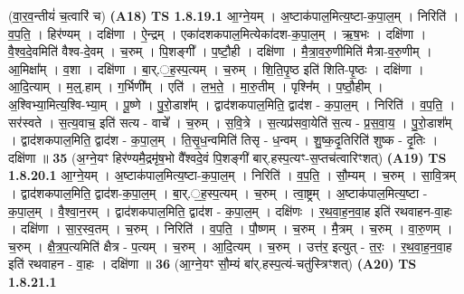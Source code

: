 \documentclass[17pt]{extarticle}
\begin{document}
                  \newline
                      (वा॒॒र॒व॒न्तीयं॑ च॒त्वारि॑ च) \textbf{(A18)} \newline \newline
                                \textbf{ TS 1.8.19.1} \newline
                  आ॒ग्ने॒यम् । अ॒ष्टाक॑पाल॒मित्य॒ष्टा-क॒पा॒ल॒म् । निरिति॑ । व॒प॒ति॒ । हिर॑ण्यम् । दक्षि॑णा । ऐ॒न्द्रम् । एका॑दशकपाल॒मित्येका॑दश-क॒पा॒ल॒म् । ऋ॒ष॒भः । दक्षि॑णा । वै॒श्व॒दे॒वमिति॑ वैश्व-दे॒वम् । च॒रुम् । पि॒शङ्गी᳚ । प॒ष्टौ॒ही । दक्षि॑णा । मै॒त्रा॒व॒रु॒णीमिति॑ मैत्रा-व॒रु॒णीम् । आ॒मिक्षा᳚म् । व॒शा । दक्षि॑णा । बा॒र्.॒ह॒स्प॒त्यम् । च॒रुम् । शि॒ति॒पृ॒ष्ठ इति॑ शिति-पृ॒ष्ठः । दक्षि॑णा । आ॒दि॒त्याम् । म॒ल्॒.हाम् । ग॒र्भिणी᳚म् । एति॑ । ल॒भ॒ते॒ । मा॒रु॒तीम् । पृश्नि᳚म् । प॒ष्ठौ॒हीम् । अ॒श्विभ्या॒मित्य॒श्वि-भ्या॒म् । पू॒ष्णे । पु॒रो॒डाश᳚म् । द्वाद॑शकपाल॒मिति॒ द्वाद॑श - क॒पा॒ल॒म् । निरिति॑ । व॒प॒ति॒ । सर॑स्वते । स॒त्य॒वाच॒ इति॑ सत्य - वाचे᳚ । च॒रुम् । स॒वि॒त्रे । स॒त्यप्र॑सवा॒येति॑ स॒त्य - प्र॒स॒वा॒य॒ । पु॒रो॒डाश᳚म् । द्वाद॑शकपाल॒मिति॒ द्वाद॑श - क॒पा॒ल॒म् । ति॒सृ॒ध॒न्वमिति॑ तिसृ - ध॒न्वम् । शु॒ष्क॒दृ॒तिरिति॑ शुष्क - दृ॒तिः । दक्षि॑णा ॥ \textbf{  35} \newline
                  \newline
                      (अ॒ग्ने॒यꣳ हिर॑ण्यमै॒द्रमृ॑ष॒भो वै᳚श्वदे॒वं पि॒शङ्गी॑ बार्.हस्प॒त्यꣳ-स॒प्तच॑त्वारिꣳशत्)  \textbf{(A19)} \newline \newline
                                \textbf{ TS 1.8.20.1} \newline
                  आ॒ग्ने॒यम् । अ॒ष्टाक॑पाल॒मित्य॒ष्टा-क॒पा॒ल॒म् । निरिति॑ । व॒प॒ति॒ । सौ॒म्यम् । च॒रुम् । सा॒वि॒त्रम् । द्वाद॑शकपाल॒मिति॒ द्वाद॑श-क॒पा॒ल॒म् । बा॒र्.॒ह॒स्प॒त्यम् । च॒रुम् । त्वा॒ष्ट्रम् । अ॒ष्टाक॑पाल॒मित्य॒ष्टा - क॒पा॒ल॒म् । वै॒श्वा॒न॒रम् । द्वाद॑शकपाल॒मिति॒ द्वाद॑श - क॒पा॒ल॒म् । दक्षि॑णः । र॒थ॒वा॒ह॒न॒वा॒ह इति॑ रथवाहन-वा॒हः । दक्षि॑णा । सा॒र॒स्व॒तम् । च॒रुम् । निरिति॑ । व॒प॒ति॒ । पौ॒ष्णम् । च॒रुम् । मै॒त्रम् । च॒रुम् । वा॒रु॒णम् । च॒रुम् । क्षै॒त्र॒प॒त्यमिति॑ क्षैत्र - प॒त्यम् । च॒रुम् । आ॒दि॒त्यम् । च॒रुम् । उत्त॑र॒ इत्युत् - त॒रः॒ । र॒थ॒वा॒ह॒न॒वा॒ह इति॑ रथवाहन - वा॒हः । दक्षि॑णा ॥ \textbf{  36} \newline
                  \newline
                      (आ॒ग्ने॒यꣳ सौ॒म्यं बा॑र्.हस्प॒त्यं-चतु॑स्त्रिꣳशत्)  \textbf{(A20)} \newline \newline
                                \textbf{ TS 1.8.21.1} \newline
\end{document}
